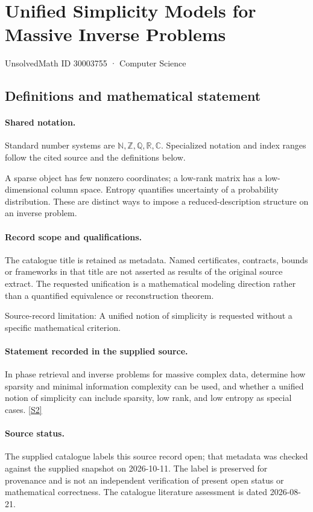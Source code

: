 \documentclass[11pt]{article}
\newcommand{\sref}[2]{\hyperlink{source:#1:#2}{[S#2]}}
\begin{document}
\setcounter{section}{30003754}
\section{Unified Simplicity Models for Massive Inverse Problems}\label{30003755}
{\small\sffamily UnsolvedMath ID 30003755 · Computer Science}
\subsection{Definitions and mathematical statement}

\paragraph{Shared notation.}Standard number systems are $\mathbb N,\mathbb Z,\mathbb Q,\mathbb R,\mathbb C$. Specialized notation and index ranges follow the cited source and the definitions below.


A sparse object has few nonzero coordinates; a low-rank matrix has a low-dimensional column space. Entropy quantifies uncertainty of a probability distribution. These are distinct ways to impose a reduced-description structure on an inverse problem.
\paragraph{Record scope and qualifications.}
The catalogue title is retained as metadata. Named certificates, contracts, bounds or frameworks in that title are not asserted as results of the original source extract.
The requested unification is a mathematical modeling direction rather than a quantified equivalence or reconstruction theorem.

Source-record limitation: A unified notion of simplicity is requested without a specific mathematical criterion.
\paragraph{Statement recorded in the supplied source.}
In phase retrieval and inverse problems for massive complex data, determine how sparsity and minimal information complexity can be used, and whether a unified notion of simplicity can include sparsity, low rank, and low entropy as special cases. \sref{30003755}{2}
\paragraph{Source status.}
The supplied catalogue labels this source record open; that metadata was checked against the supplied snapshot on 2026-10-11. The label is preserved for provenance and is not an independent verification of present open status or mathematical correctness. The catalogue literature assessment is dated 2026-08-21.
\end{document}
